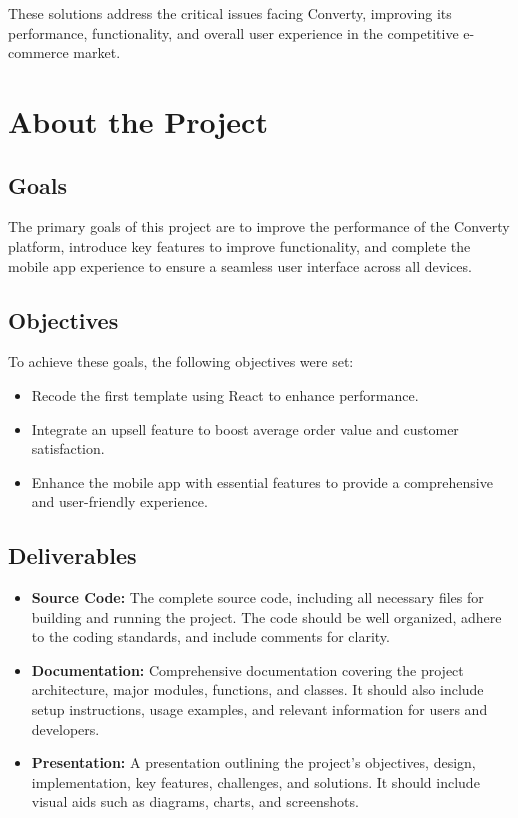 These solutions address the critical issues facing Converty, improving its performance, functionality, and overall user experience in the competitive e-commerce market.
\newline

\section{About the Project}

\subsection{Goals}
The primary goals of this project are to improve the performance of the Converty platform, introduce key features to improve functionality, and complete the mobile app experience to ensure a seamless user interface across all devices.

\subsection{Objectives}
To achieve these goals, the following objectives were set:
\begin{itemize}
    \item Recode the first template using React to enhance performance.
    \item Integrate an upsell feature to boost average order value and customer satisfaction.
    \item Enhance the mobile app with essential features to provide a comprehensive and user-friendly experience.
\end{itemize}

\subsection{Deliverables}
\begin{itemize}
    \item \textbf{Source Code:} The complete source code, including all necessary files for building and running the project. The code should be well organized, adhere to the coding standards, and include comments for clarity.
    \item \textbf{Documentation:} Comprehensive documentation covering the project architecture, major modules, functions, and classes. It should also include setup instructions, usage examples, and relevant information for users and developers.
    \item \textbf{Presentation:} A presentation outlining the project's objectives, design, implementation, key features, challenges, and solutions. It should include visual aids such as diagrams, charts, and screenshots.
\end{itemize}

